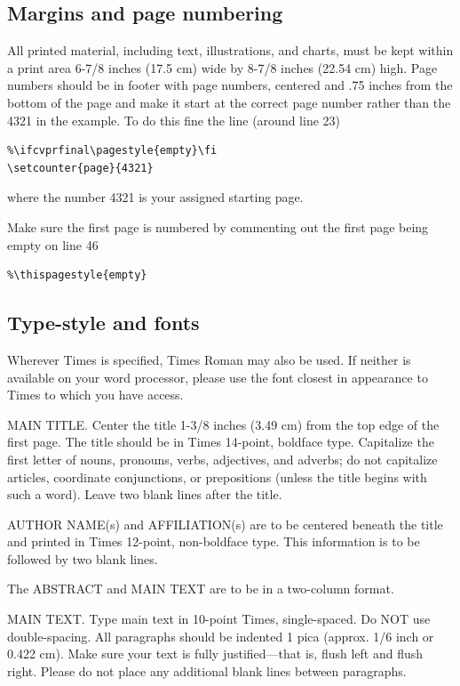 \documentclass[10pt,twocolumn,letterpaper]{article}
\begin{document}
\subsection{Margins and page numbering}

All printed material, including text, illustrations, and charts, must be kept
within a print area 6-7/8 inches (17.5 cm) wide by 8-7/8 inches (22.54 cm)
high.
Page numbers should be in footer with page numbers, centered and .75
inches from the bottom of the page and make it start at the correct page
number rather than the 4321 in the example.  To do this fine the line (around
line 23)
\begin{verbatim}
%\ifcvprfinal\pagestyle{empty}\fi
\setcounter{page}{4321}
\end{verbatim}
where the number 4321 is your assigned starting page.

Make sure the first page is numbered by commenting out the first page being
empty on line 46
\begin{verbatim}
%\thispagestyle{empty}
\end{verbatim}


\subsection{Type-style and fonts}

Wherever Times is specified, Times Roman may also be used. If neither is
available on your word processor, please use the font closest in
appearance to Times to which you have access.

MAIN TITLE. Center the title 1-3/8 inches (3.49 cm) from the top edge of
the first page. The title should be in Times 14-point, boldface type.
Capitalize the first letter of nouns, pronouns, verbs, adjectives, and
adverbs; do not capitalize articles, coordinate conjunctions, or
prepositions (unless the title begins with such a word). Leave two blank
lines after the title.

AUTHOR NAME(s) and AFFILIATION(s) are to be centered beneath the title
and printed in Times 12-point, non-boldface type. This information is to
be followed by two blank lines.

The ABSTRACT and MAIN TEXT are to be in a two-column format.

MAIN TEXT. Type main text in 10-point Times, single-spaced. Do NOT use
double-spacing. All paragraphs should be indented 1 pica (approx. 1/6
inch or 0.422 cm). Make sure your text is fully justified---that is,
flush left and flush right. Please do not place any additional blank
lines between paragraphs.
\end{document}
